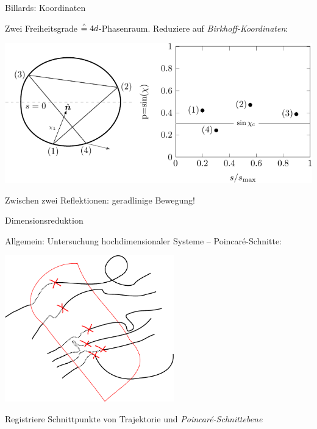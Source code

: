 \begin{frame}{Billards: Koordinaten}

  Zwei Freiheitsgrade $\stackrel{\scriptscriptstyle\wedge}{=} 4d$-Phasenraum. Reduziere auf \emph{Birkhoff-Koordinaten}:

  \begin{center}
    \includegraphics[width=0.95\linewidth]{Figures/Billiard-crop.pdf}
  \end{center}

  Zwischen zwei Reflektionen: geradlinige Bewegung!
\end{frame}


\begin{frame}{Dimensionsreduktion}

  Allgemein: Untersuchung hochdimensionaler Systeme -- Poincar\'e-Schnitte:

  \begin{center}
    \includegraphics[width=0.55\textwidth]{Figures/PSOS.pdf}
  \end{center}

  Registriere Schnittpunkte von Trajektorie und \emph{Poincar\'e-Schnittebene}
\end{frame}


